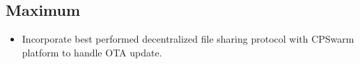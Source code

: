 \documentclass[12pt]{article}
\begin{document}
\subsection{Maximum}
\begin{itemize}
\item Incorporate best performed decentralized file sharing protocol with CPSwarm platform to handle OTA update.
\end{itemize}




\newpage
\end{document}
